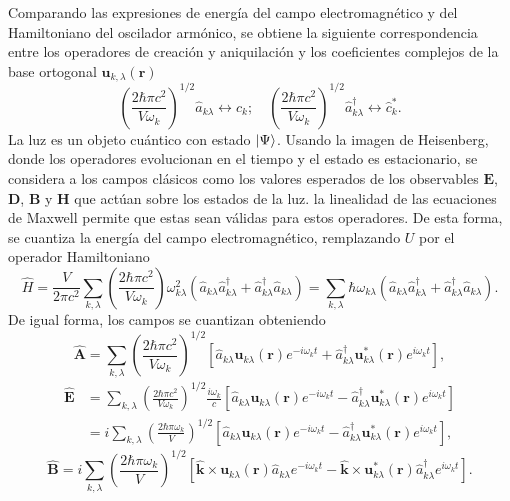 Comparando las expresiones de energía del campo electromagnético y del Hamiltoniano del oscilador armónico, se obtiene la siguiente correspondencia entre los operadores de creación y aniquilación y los coeficientes complejos de la base ortogonal $\mathbf{u}_{k,\lambda}(\mathbf{r})$ \cite{Loudon}
\begin{equation*}
  \left( \frac{2\hbar \pi c^2}{V\omega_k} \right)^{1/2} \hat{a}_{k\lambda} \leftrightarrow \hat{c}_{k}; \quad \left( \frac{2\hbar \pi c^2}{V\omega_k} \right)^{1/2} \hat{a}^{\dagger}_{k\lambda} \leftrightarrow \hat{c}_{k}^*.
\end{equation*}
La luz es un objeto cuántico con estado $\ket{\Psi}$. Usando la imagen de Heisenberg, donde los operadores evolucionan en el tiempo y el estado es estacionario, se considera a los campos clásicos como los valores esperados de los observables $\mathbf{E}$, $\mathbf{D}$, $\mathbf{B}$ y $\mathbf{H}$ que actúan sobre los estados de la luz. la linealidad de las ecuaciones de Maxwell  permite que estas sean válidas para estos operadores. \cite{Leonhardt} De esta forma, se cuantiza la energía del campo electromagnético, remplazando $U$ por el operador Hamiltoniano
\begin{equation*}
  \hat{H}  =  \frac{V}{2\pi c^2}\sum_{k,\lambda} \left( \frac{2\hbar \pi c^2}{V\omega_k} \right) \omega_{k\lambda}^2 \left( \hat{a}_{k\lambda} \hat{a}^{\dagger}_{k\lambda} + \hat{a}^{\dagger}_{k\lambda} \hat{a}_{k\lambda} \right) = \sum_{k,\lambda} \hbar \omega_{k\lambda} \left( \hat{a}_{k\lambda} \hat{a}^{\dagger}_{k\lambda} + \hat{a}^{\dagger}_{k\lambda} \hat{a}_{k\lambda} \right).
\end{equation*}
De igual forma, los campos se cuantizan obteniendo \cite{Agarwal_2012}
\begin{equation*}
  \hat{\mathbf{A}} =  \sum_{k,\lambda} \left( \frac{2\hbar \pi c^2}{V\omega_k} \right)^{1/2} \left[ \hat{a}_{k\lambda} \mathbf{u}_{k\lambda} (\mathbf{r})e^{-i\omega_k t} + \hat{a}^{\dagger}_{k\lambda} \mathbf{u}_{k\lambda}^* (\mathbf{r})e^{i\omega_{k} t} \right],
\end{equation*}
\begin{align*}
  \hat{\mathbf{E}} & = \sum_{k,\lambda} \left( \frac{2\hbar \pi c^2}{V\omega_k} \right)^{1/2} \frac{i\omega_{k}}{c} \left[ \hat{a}_{k\lambda} \mathbf{u}_{k\lambda} (\mathbf{r})e^{-i\omega_k t} -  \hat{a}^{\dagger}_{k\lambda} \mathbf{u}_{k\lambda}^* (\mathbf{r})e^{i\omega_{k} t} \right] \\
                   & = i \sum_{k,\lambda} \left( \frac{2\hbar \pi \omega_k}{V} \right)^{1/2} \left[ \hat{a}_{k\lambda} \mathbf{u}_{k\lambda} (\mathbf{r})e^{-i\omega_k t} -  \hat{a}^{\dagger}_{k\lambda} \mathbf{u}_{k\lambda}^* (\mathbf{r})e^{i\omega_{k} t} \right],
\end{align*}
\begin{equation*}
  \hat{\mathbf{B}} = i \sum_{k,\lambda} \left( \frac{2\hbar \pi \omega_k}{V} \right)^{1/2} \left[ \mathbf{\hat{k}} \times \mathbf{u}_{k\lambda}(\mathbf{r}) \hat{a}_{k\lambda} e^{-i\omega_k t} - \mathbf{\hat{k}} \times \mathbf{u}_{k\lambda}^* (\mathbf{r}) \hat{a}^{\dagger}_{k\lambda} e^{i\omega_{k} t} \right].
\end{equation*}